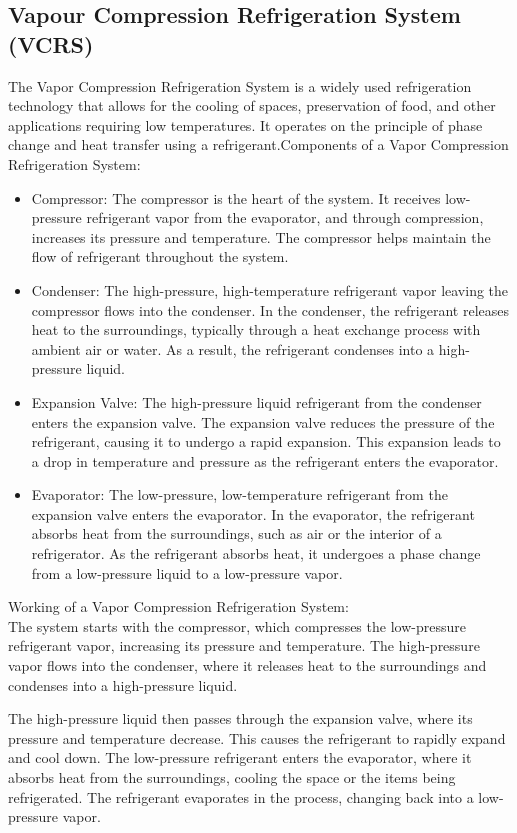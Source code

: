 \documentclass{article}
\begin{document}
\subsection{Vapour Compression Refrigeration System (VCRS)}
The Vapor Compression Refrigeration System is a widely used refrigeration technology that allows for the cooling of spaces, preservation of food, and other applications requiring low temperatures. It operates on the principle of phase change and heat transfer using a refrigerant.Components of a Vapor Compression Refrigeration System:
\begin{itemize}
  \item Compressor: The compressor is the heart of the system. It receives low-pressure refrigerant vapor from the evaporator, and through compression, increases its pressure and temperature. The compressor helps maintain the flow of refrigerant throughout the system.
  \item Condenser: The high-pressure, high-temperature refrigerant vapor leaving the compressor flows into the condenser. In the condenser, the refrigerant releases heat to the surroundings, typically through a heat exchange process with ambient air or water. As a result, the refrigerant condenses into a high-pressure liquid.
  \item Expansion Valve: The high-pressure liquid refrigerant from the condenser enters the expansion valve. The expansion valve reduces the pressure of the refrigerant, causing it to undergo a rapid expansion. This expansion leads to a drop in temperature and pressure as the refrigerant enters the evaporator.
  \item Evaporator: The low-pressure, low-temperature refrigerant from the expansion valve enters the evaporator. In the evaporator, the refrigerant absorbs heat from the surroundings, such as air or the interior of a refrigerator. As the refrigerant absorbs heat, it undergoes a phase change from a low-pressure liquid to a low-pressure vapor.
\end{itemize}

Working of a Vapor Compression Refrigeration System:\\


The system starts with the compressor, which compresses the low-pressure refrigerant vapor, increasing its pressure and temperature. The high-pressure vapor flows into the condenser, where it releases heat to the surroundings and condenses into a high-pressure liquid.


The high-pressure liquid then passes through the expansion valve, where its pressure and temperature decrease. This causes the refrigerant to rapidly expand and cool down. The low-pressure refrigerant enters the evaporator, where it absorbs heat from the surroundings, cooling the space or the items being refrigerated. The refrigerant evaporates in the process, changing back into a low-pressure vapor.
\end{document}
